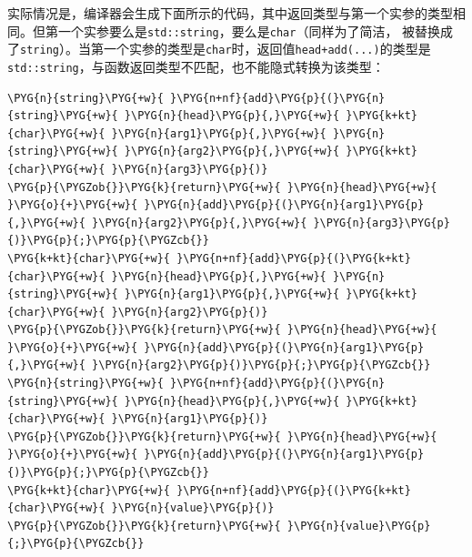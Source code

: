 
实际情况是，编译器会生成下面所示的代码，其中返回类型与第一个实参的类型相同。但第一个实参要么是\texttt{std::\allowbreak{}string}，要么是\texttt{char}（同样为了简洁， 被替换成了\texttt{string}）。当第一个实参的类型是\texttt{char}时，返回值\texttt{head+add(...)}的类型是\texttt{std::\allowbreak{}string}，与函数返回类型不匹配，也不能隐式转换为该类型：



\begin{codeblockbg}
\begin{Verbatim}[commandchars=\\\{\},breaklines=true,breakanywhere=true,fontsize=\codefont,xleftmargin=17bp]
\PYG{n}{string}\PYG{+w}{ }\PYG{n+nf}{add}\PYG{p}{(}\PYG{n}{string}\PYG{+w}{ }\PYG{n}{head}\PYG{p}{,}\PYG{+w}{ }\PYG{k+kt}{char}\PYG{+w}{ }\PYG{n}{arg1}\PYG{p}{,}\PYG{+w}{ }\PYG{n}{string}\PYG{+w}{ }\PYG{n}{arg2}\PYG{p}{,}\PYG{+w}{ }\PYG{k+kt}{char}\PYG{+w}{ }\PYG{n}{arg3}\PYG{p}{)}
\PYG{p}{\PYGZob{}}\PYG{k}{return}\PYG{+w}{ }\PYG{n}{head}\PYG{+w}{ }\PYG{o}{+}\PYG{+w}{ }\PYG{n}{add}\PYG{p}{(}\PYG{n}{arg1}\PYG{p}{,}\PYG{+w}{ }\PYG{n}{arg2}\PYG{p}{,}\PYG{+w}{ }\PYG{n}{arg3}\PYG{p}{)}\PYG{p}{;}\PYG{p}{\PYGZcb{}}
\PYG{k+kt}{char}\PYG{+w}{ }\PYG{n+nf}{add}\PYG{p}{(}\PYG{k+kt}{char}\PYG{+w}{ }\PYG{n}{head}\PYG{p}{,}\PYG{+w}{ }\PYG{n}{string}\PYG{+w}{ }\PYG{n}{arg1}\PYG{p}{,}\PYG{+w}{ }\PYG{k+kt}{char}\PYG{+w}{ }\PYG{n}{arg2}\PYG{p}{)}
\PYG{p}{\PYGZob{}}\PYG{k}{return}\PYG{+w}{ }\PYG{n}{head}\PYG{+w}{ }\PYG{o}{+}\PYG{+w}{ }\PYG{n}{add}\PYG{p}{(}\PYG{n}{arg1}\PYG{p}{,}\PYG{+w}{ }\PYG{n}{arg2}\PYG{p}{)}\PYG{p}{;}\PYG{p}{\PYGZcb{}}
\PYG{n}{string}\PYG{+w}{ }\PYG{n+nf}{add}\PYG{p}{(}\PYG{n}{string}\PYG{+w}{ }\PYG{n}{head}\PYG{p}{,}\PYG{+w}{ }\PYG{k+kt}{char}\PYG{+w}{ }\PYG{n}{arg1}\PYG{p}{)}
\PYG{p}{\PYGZob{}}\PYG{k}{return}\PYG{+w}{ }\PYG{n}{head}\PYG{+w}{ }\PYG{o}{+}\PYG{+w}{ }\PYG{n}{add}\PYG{p}{(}\PYG{n}{arg1}\PYG{p}{)}\PYG{p}{;}\PYG{p}{\PYGZcb{}}
\PYG{k+kt}{char}\PYG{+w}{ }\PYG{n+nf}{add}\PYG{p}{(}\PYG{k+kt}{char}\PYG{+w}{ }\PYG{n}{value}\PYG{p}{)}
\PYG{p}{\PYGZob{}}\PYG{k}{return}\PYG{+w}{ }\PYG{n}{value}\PYG{p}{;}\PYG{p}{\PYGZcb{}}
\end{Verbatim}
\end{codeblockbg}



